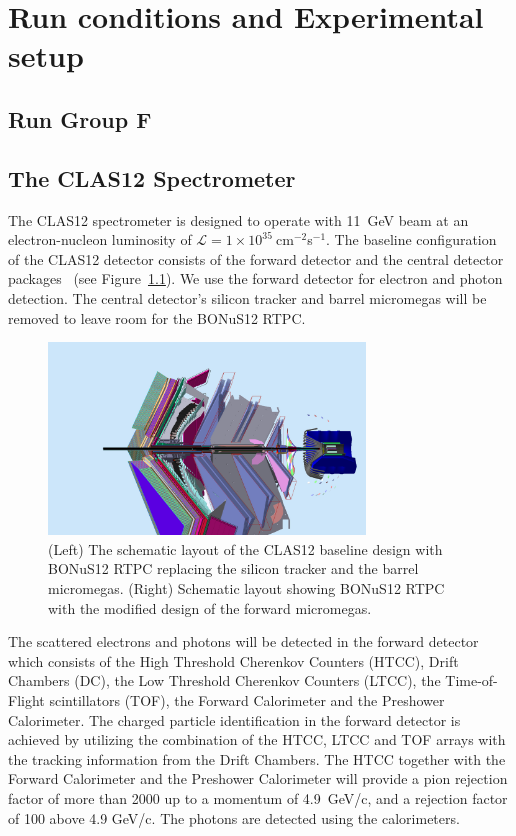 \chapter{Run conditions and Experimental setup}
\label{chap:physics}


\section{Run Group F}




\section{The CLAS12 Spectrometer}
The CLAS12 spectrometer is designed to operate with 11~GeV beam at an 
electron-nucleon luminosity of $\mathcal{L} = 
1\times10^{35}~$cm$^{-2}$s$^{-1}$. The baseline configuration of the CLAS12 
detector consists of the forward detector and the central detector 
packages~\cite{CD} (see Figure~\ref{fig:fd}). We use the forward detector for 
electron and photon detection. The central detector's silicon tracker and 
barrel micromegas will be removed to leave room for the BONuS12 RTPC.  

\begin{figure}
  \begin{center}
    \includegraphics[angle=0, width=0.75\textwidth]{figures/clas12_bonus12.png}
     \caption{(Left) The schematic layout of the CLAS12 baseline design with 
     BONuS12 RTPC replacing the silicon tracker and the barrel micromegas.  
     (Right) Schematic layout showing BONuS12 RTPC with the modified design of 
     the forward micromegas.}
    \label{fig:fd}
  \end{center}
\end{figure}

The scattered electrons and photons will be detected in the forward detector which consists 
of the High Threshold Cherenkov Counters (HTCC), Drift Chambers (DC), the Low 
Threshold Cherenkov Counters (LTCC), the Time-of-Flight scintillators (TOF), 
the Forward Calorimeter and the Preshower Calorimeter. The charged particle 
identification in the forward detector is achieved by utilizing the combination 
of the HTCC, LTCC and TOF arrays with the tracking information from the Drift 
Chambers. The HTCC together with the Forward Calorimeter and the Preshower 
Calorimeter will provide a pion rejection factor of more than 2000 up to a 
momentum of 4.9~GeV/c, and a rejection factor of 100 above 4.9 GeV/c. The photons
are detected using the calorimeters.

